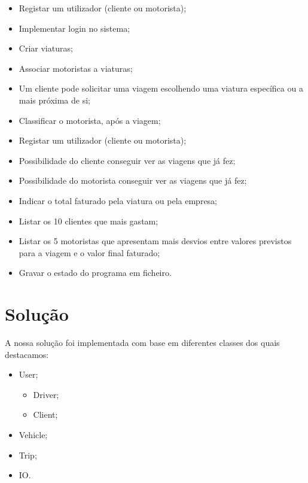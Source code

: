 \documentclass[a4paper]{article}
\begin{document}
\begin{itemize}
\item Registar um utilizador (cliente ou motorista);
\item Implementar login no sistema;
\item Criar viaturas;
\item Associar motoristas a viaturas;
\item Um cliente pode solicitar uma viagem escolhendo uma viatura específica ou a mais próxima de si;
\item Classificar o motorista, após a viagem;
\item Registar um utilizador (cliente ou motorista);
\item Possibilidade do cliente conseguir ver as viagens que já fez;
\item Possibilidade do motorista conseguir ver as viagens que já fez;
\item Indicar o total faturado pela viatura ou pela empresa;
\item Listar os 10 clientes que mais gastam;
\item Listar os 5 motoristas que apresentam mais desvios entre valores previstos para a viagem e o valor final faturado;
\item Gravar o estado do programa em ficheiro.

\end{itemize}

\section{Solução}
A nossa solução foi implementada com base em diferentes classes dos quais destacamos:

\begin{itemize}
    \item User;
         \begin{itemize}
         \item{Driver;}
         \item{Client;}
         \end{itemize}
    \item Vehicle;
    \item Trip;
    \item IO.
\end{itemize}
\label{sec:solucao}
\end{document}

